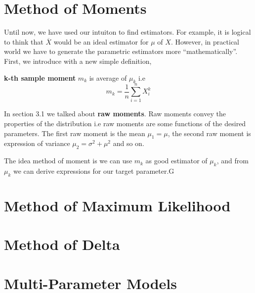 \section{Method of Moments}
Until now, we have used our intuiton to find estimators. For example, it is logical to think that $\overline{X}$ would be an ideal estimator for $\mu$ of $X$. However, in practical world we have to generate the parametric estimators more ``mathematically''.
First, we introduce with a new simple definition,
\begin{definition}
    \textbf{k-th sample moment} $m_k$ is average of $\mu_{k}$ i.e 
    \[m_k = \frac{1}{n} \sum_{i = 1}^n X_{i}^k \]
\end{definition}
In section 3.1 we talked about \textbf{raw moments}. Raw moments convey the properties of the distribution i.e raw moments are some functions of the desired parameters. The first raw moment is the mean $\mu_1 = \mu$, the second raw moment is expression of variance  $\mu_{2}= \sigma^2+ \mu^2$ and so on.

The idea method of moment is  we can use $m_k$ as good estimator of $\mu_k$, and from $\mu_k$ we can derive expressions for our target parameter.G
\section{Method of Maximum Likelihood}
\section{Method of Delta}
\section{Multi-Parameter Models}


